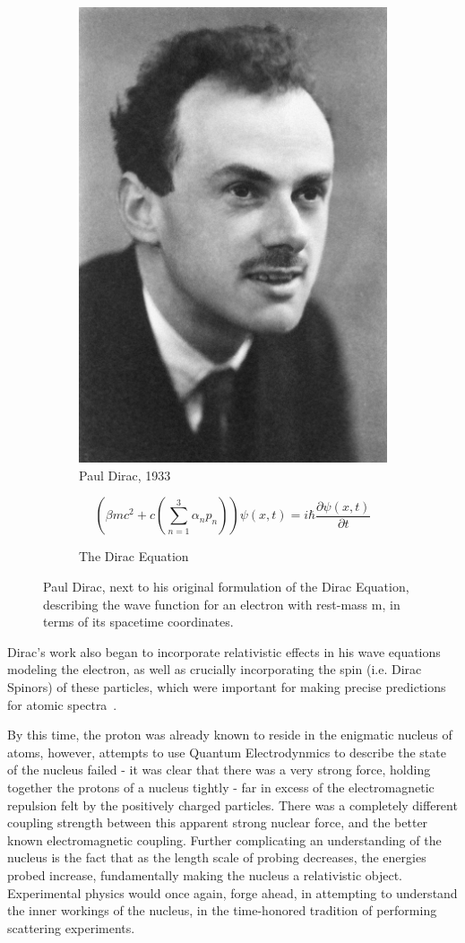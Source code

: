 \begin{figure}[ht]
	\centering
	\begin{subfigure}{.4\textwidth}
		\centering
		\includegraphics[width=0.4\linewidth]{../Chapter2/fig/pauldirac.jpg}
		\caption{Paul Dirac, 1933}
		\label{fig:pauldirac}
	\end{subfigure}%
	\begin{subfigure}{0.6\textwidth}
		\centering
		\begin{equation}
			\left(\beta mc^2 + c\left(\sum_{n \mathop =1}^{3}\alpha_n p_n\right)\right) \psi (x,t) = i \hbar \frac{\partial\psi(x,t) }{\partial t}
		\end{equation}
		\caption{The Dirac Equation}
		\label{eq:diracquation}
	\end{subfigure}
	\caption{ 
		Paul Dirac, next to his original formulation of the Dirac Equation,
		describing the wave function for an electron with rest-mass m, in terms of
		its spacetime coordinates.
	}
	\label{fig:thomsonrays}
\end{figure}

Dirac's work also began to incorporate relativistic effects in his wave
equations modeling the electron, as well as crucially incorporating the spin
(i.e. Dirac Spinors) of these particles, which were important for making precise
predictions for atomic spectra~\needcite{}.

By this time, the proton was already known to reside in the enigmatic nucleus of
atoms, however, attempts to use Quantum Electrodynmics to describe the state of
the nucleus failed - it was clear that there was a very strong force, holding
together the protons of a nucleus tightly - far in excess of the electromagnetic
repulsion felt by the positively charged particles. There was a completely
different coupling strength between this apparent strong nuclear force, and the
better known electromagnetic coupling. Further complicating an understanding of
the nucleus is the fact that as the length scale of probing decreases, the
energies probed increase, fundamentally making the nucleus a relativistic
object. Experimental physics would once again, forge ahead, in attempting to
understand the inner workings of the nucleus, in the time-honored tradition of
performing scattering experiments.

